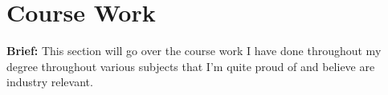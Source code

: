 \newpage
\section{Course Work}
\label{sec:course_work}

\textbf{Brief: } This section will go over the course work I have done throughout my degree throughout various subjects that I'm quite proud of and believe are industry relevant.




